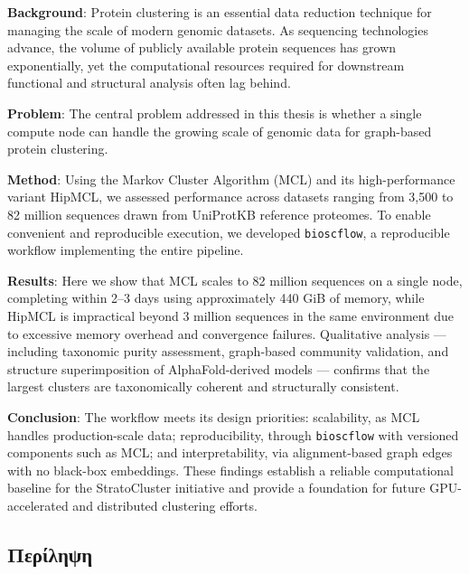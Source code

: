 \documentclass[a4paper,12pt]{extarticle}
\begin{document}
  \textbf{Background}: Protein clustering is an essential data reduction technique for managing the scale of modern genomic datasets. As sequencing technologies advance, the volume of publicly available protein sequences has grown exponentially, yet the computational resources required for downstream functional and structural analysis often lag behind.

  \textbf{Problem}: The central problem addressed in this thesis is whether a single compute node can handle the growing scale of genomic data for graph-based protein clustering.

  \textbf{Method}: Using the Markov Cluster Algorithm (MCL) and its high-performance variant HipMCL, we assessed performance across datasets ranging from 3,500 to 82 million sequences drawn from UniProtKB reference proteomes. To enable convenient and reproducible execution, we developed \texttt{bioscflow}, a reproducible workflow implementing the entire pipeline.

  \textbf{Results}: Here we show that MCL scales to 82 million sequences on a single node, completing within 2--3 days using approximately 440 GiB of memory, while HipMCL is impractical beyond 3 million sequences in the same environment due to excessive memory overhead and convergence failures. Qualitative analysis --- including taxonomic purity assessment, graph-based community validation, and structure superimposition of AlphaFold-derived models --- confirms that the largest clusters are taxonomically coherent and structurally consistent.

  \textbf{Conclusion}: The workflow meets its design priorities: scalability, as MCL handles production-scale data; reproducibility, through \texttt{bioscflow} with versioned components such as MCL; and interpretability, via alignment-based graph edges with no black-box embeddings. These findings establish a reliable computational baseline for the StratoCluster initiative and provide a foundation for future GPU-accelerated and distributed clustering efforts.

  \vspace{0.3cm}


  \vspace{\fill}

  \subsection*{%
    \center Περίληψη
  }
\end{document}

